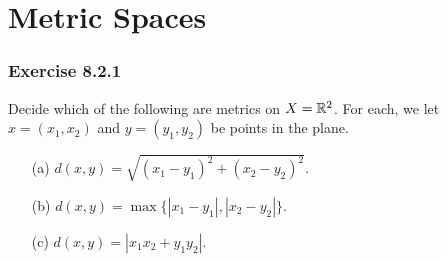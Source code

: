\section{Metric Spaces}
\subsubsection{Exercise 8.2.1} Decide which of the following are metrics on \( X = \mathbb{R}^2  \). For each, we let \( x = (x_{1}, x_{2}) \) and \( y = (y_{1}, y_{2}) \) be points in the plane.
\begin{enumerate}
    \item[(a)] \( d(x,y) = \sqrt{ (x_{1}- y_{1})^2 + (x_{2} - y_{2})^{2} }. \)
    \item[(b)] \( d(x,y) = \max \{ | x_{1} - y_{1} |, | x_{2} - y_{2} |  \}. \)
    \item[(c)] \( d(x,y) = | x_{1} x_{2} + y_{1} y_{2} |  \).
\end{enumerate}

